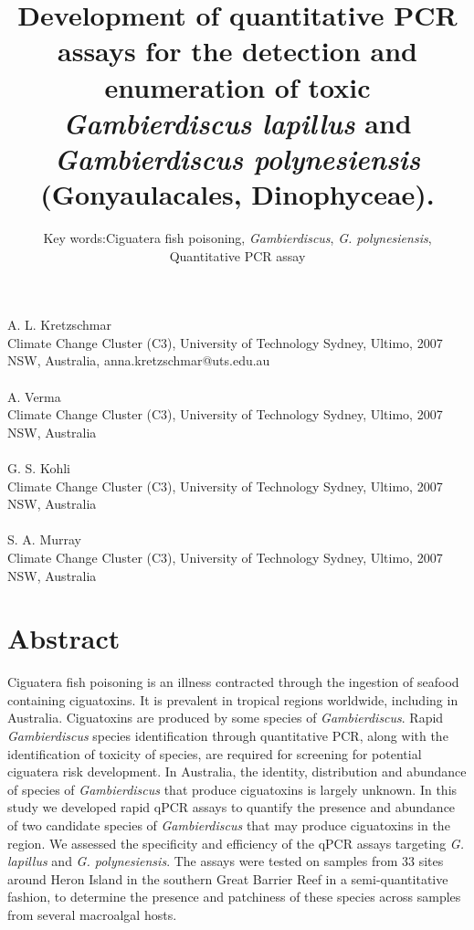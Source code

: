 \documentclass[12pt]{article}
\title{Development of quantitative PCR assays for the detection and enumeration of toxic \emph{Gambierdiscus lapillus} and \emph{Gambierdiscus polynesiensis} (Gonyaulacales, Dinophyceae).}
\author{Key words:Ciguatera fish poisoning, \emph{Gambierdiscus}, \emph{G. polynesiensis},\\
 Quantitative PCR assay}
\date{}
\begin{document}
\maketitle
\paragraph{}A. L. Kretzschmar\\
Climate Change Cluster (C3), University of Technology Sydney, Ultimo, 2007 NSW, Australia, anna.kretzschmar@uts.edu.au
\paragraph{}A. Verma \\
Climate Change Cluster (C3), University of Technology Sydney, Ultimo, 2007 NSW, Australia
\paragraph{}G. S. Kohli\\
Climate Change Cluster (C3), University of Technology Sydney, Ultimo, 2007 NSW, Australia
\paragraph{}S. A. Murray\\
Climate Change Cluster (C3), University of Technology Sydney, Ultimo, 2007 NSW, Australia
\newpage
\section*{Abstract}
Ciguatera fish poisoning is an illness contracted through the ingestion of seafood containing ciguatoxins. It is prevalent in tropical regions worldwide, including in Australia. Ciguatoxins are produced by some species of \emph{Gambierdiscus}. Rapid \emph{Gambierdiscus} species identification through quantitative PCR, along with the identification of toxicity of species, are required for screening for potential ciguatera risk development. In Australia, the identity, distribution and abundance of species of \textit{Gambierdiscus} that produce ciguatoxins is largely unknown. In this study we developed rapid qPCR assays to quantify the presence and abundance of two candidate species of \textit{Gambierdiscus} that may produce ciguatoxins in the region. %
We assessed the specificity and efficiency of the  qPCR assays targeting \textit{G. lapillus} and \textit{G. polynesiensis}. The assays were tested on samples from 33 sites around Heron Island in the southern Great Barrier Reef in a semi-quantitative fashion, to determine the presence and patchiness of these species across samples from several macroalgal hosts.  
\end{document}

